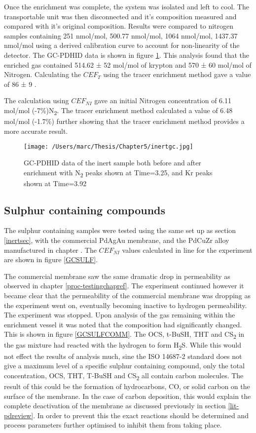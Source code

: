 Once the enrichment was complete, the system was isolated and left to cool. The transportable unit was then disconnected and it's composition measured and compared with it's original composition. Results were compared to nitrogen samples containing 251 nmol/mol, 500.77 nmol/mol, 1064 nmol/mol, 1437.37 nmol/mol using a derived calibration curve to account for non-linearity of the detector. The GC-PDHID data is shown in figure \ref{GCinert}. This analysis found that the enriched gas contained 514.62 ± 52 \textmu mol/mol of krypton and 570 ± 60 \textmu mol/mol of Nitrogen. Calculating the $CEF_T$ using the tracer enrichment method gave a value of 86 ± 9 . 

The calculation using $CEF_{NI}$ gave an initial Nitrogen concentration of 6.11 \textmu mol/mol (-7\%)N\textsubscript{2}. The tracer enrichment method calculated a value of 6.48 \textmu mol/mol (-1.7\%) further showing that the tracer enrichment method provides a more accurate result. 

\begin{figure}[H]
    \centering
    \texttt{[image: /Users/marc/Thesis/Chapter5/inertgc.jpg]}
    \caption{GC-PDHID data of the inert sample both before and after enrichment with N\textsubscript{2} peaks shown at Time=3.25, and Kr peaks shown at Time=3.92}
    \label{GCinert}
\end{figure}

\subsection{Sulphur containing compounds}
The sulphur containing samples were tested using the same set up as section \ref{inertsec}, with the commercial PdAgAu membrane, and the PdCuZr alloy manufactured in chapter \label{proc-testingchapref}. The $CEF_{NI}$ values calculated in line for the experiment are shown in figure \ref{GCSULF}.

The commercial membrane saw the same dramatic drop in permeability as observed in chapter \ref{proc-testingchapref}. The experiment continued however it became clear that the permeability of the commercial membrane was dropping as the experiment went on, eventually becoming inactive to hydrogen permeability. The experiment was stopped. Upon analysis of the gas remaining within the enrichment vessel it was noted that the composition had significantly changed. This is shown in figure \ref{GCSULFCOMM}. The OCS, t-BuSH, THT and CS\textsubscript{2} in the gas mixture had reacted with the hydrogen to form H\textsubscript{2}S. While this would not effect the results of analysis much, sine the ISO 14687-2 standard does not give a maximum level of a specific sulphur containing compound, only the total concentration, OCS, THT, T-BuSH and CS\textsubscript{2} all contain carbon molecules. The result of this could be the formation of hydrocarbons, CO, or solid carbon on the surface of the membrane. In the case of carbon deposition, this would explain the complete deactivation of the membrane as discussed previously in section \ref{lit-pdreview}. In order to prevent this the exact reactions should be determined and process parameters further optimised to inhibit them from taking place. 

